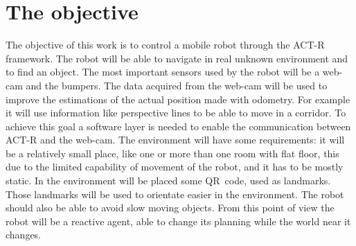 \section{The objective}
The objective of this work is to control a mobile robot through the \mbox{ACT-R} framework. The robot will be able to navigate in real unknown environment and to find an object. The most important sensors used by the robot will be a \mbox{web-cam} and the bumpers. The data acquired from the \mbox{web-cam} will be used to improve the estimations of the actual position made with odometry. For example it will use information like perspective lines to be able to move in a corridor.
To achieve this goal a software layer is needed to enable the communication between ACT-R and the \mbox{web-cam}. The environment will have some requirements: it will be a relatively small place, like one or more than one room with flat floor, this due to the limited capability of movement of the robot, and it has to be mostly static. In the environment will be placed some \mbox{QR code}, used as landmarks. Those landmarks will be used to orientate easier in the environment.
The robot should also be able to avoid slow moving objects. From this point of view the robot will be a reactive agent, able to change its planning while the world near it changes. 







